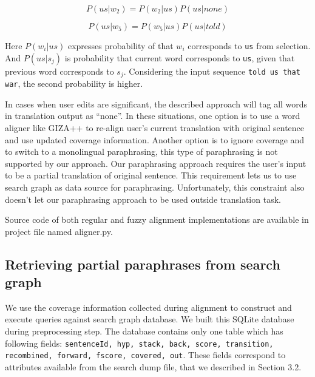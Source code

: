 \begin{large}
\begin{equation}
P(us|w_{2}) = P(w_{2}|us) P(us|none)
\end{equation}
\end{large}

\begin{large}
\begin{equation}
P(us|w_{5}) = P(w_{5}|us) P(us|told)
\end{equation}
\end{large}

Here $P(w_{i}|us)$ expresses probability of that $w_{i}$ corresponds to \texttt{us} from selection. And $P(us|s_{j})$ is probability that current word corresponds to \texttt{us}, given that previous word corresponds to $s_{j}$. Considering the input sequence \texttt{told us that war}, the second probability is higher.

In cases when user edits are significant, the described approach will tag all words in translation output as ``none''. In these situations, one option is to use a word aligner like GIZA++ to re-align user's current translation with original sentence and use updated coverage information. Another option is to ignore coverage and to switch to a monolingual paraphrasing, this type of paraphrasing is not supported by our approach. Our paraphrasing approach requires the user's input to be a partial translation of original sentence. This requirement lets us to use search graph as data source for paraphrasing. Unfortunately, this constraint also doesn't let our paraphrasing approach to be used outside translation task.

Source code of both regular and fuzzy alignment implementations are available in project file named \textsf{aligner.py}. 

\subsection{Retrieving partial paraphrases from search graph}

We use the coverage information collected during alignment to construct and execute queries against search graph database. We built this SQLite database during preprocessing step. The database contains only one table which has following fields: \texttt{sentenceId, hyp, stack, back, score, transition, recombined, forward, fscore, covered, out}. These fields correspond to attributes available from the search dump file, that we described in Section 3.2. 

